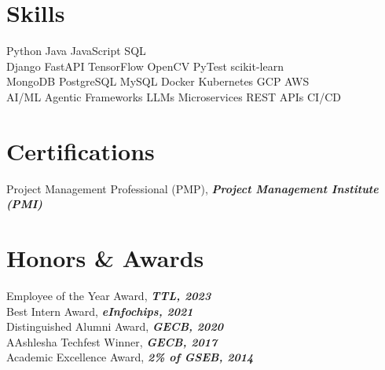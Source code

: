 \documentclass[]{deedy-resume-openfont}
\begin{document}
\begin{minipage}[t]{0.35\textwidth}

\section{Skills}
Python \textbullet{} Java \textbullet{} JavaScript \textbullet{} SQL \\
Django \textbullet{} FastAPI \textbullet{} TensorFlow \textbullet{} OpenCV \textbullet{} PyTest \textbullet{} scikit-learn \\
MongoDB \textbullet{} PostgreSQL \textbullet{} MySQL \textbullet{} Docker \textbullet{} Kubernetes \textbullet{} GCP \textbullet{} AWS \\
AI/ML \textbullet{} Agentic Frameworks \textbullet{} LLMs \textbullet{} Microservices \textbullet{} REST APIs \textbullet{} CI/CD
\sectionsep


\section{Certifications}
Project Management Professional (PMP)\textregistered, {\footnotesize \textit{\textbf{Project Management Institute (PMI)\textregistered}}}\\
\sectionsep


\section{Honors \& Awards}
Employee of the Year Award, {\footnotesize \textit{\textbf{TTL, 2023}}}\\
Best Intern Award, {\footnotesize \textit{\textbf{eInfochips, 2021}}}\\
Distinguished Alumni Award, {\footnotesize \textit{\textbf{GECB, 2020}}}\\
AAshlesha Techfest Winner, {\footnotesize \textit{\textbf{GECB, 2017}}}\\
Academic Excellence Award, {\footnotesize \textit{\textbf{2\% of GSEB, 2014}}}\\
\sectionsep


\end{minipage}
\end{document}
